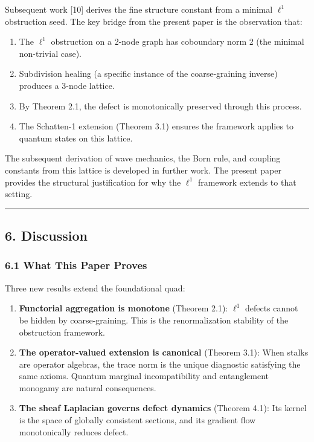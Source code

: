 \documentclass[
]{article}
\providecommand{\tightlist}{%
  \setlength{\itemsep}{0pt}\setlength{\parskip}{0pt}}
\begin{document}
Subsequent work {[}10{]} derives the fine structure constant from a
minimal \(\ell^1\) obstruction seed. The key bridge from the present
paper is the observation that:

\begin{enumerate}
\def\labelenumi{\arabic{enumi}.}
\tightlist
\item
  The \(\ell^1\) obstruction on a 2-node graph has coboundary norm 2
  (the minimal non-trivial case).
\item
  Subdivision healing (a specific instance of the coarse-graining
  inverse) produces a 3-node lattice.
\item
  By Theorem 2.1, the defect is monotonically preserved through this
  process.
\item
  The Schatten-1 extension (Theorem 3.1) ensures the framework applies
  to quantum states on this lattice.
\end{enumerate}

The subsequent derivation of wave mechanics, the Born rule, and coupling
constants from this lattice is developed in further work. The present
paper provides the structural justification for why the \(\ell^1\)
framework extends to that setting.

\begin{center}\rule{0.5\linewidth}{0.5pt}\end{center}

\subsection{6. Discussion}\label{discussion}

\subsubsection{6.1 What This Paper Proves}\label{what-this-paper-proves}

Three new results extend the foundational quad:

\begin{enumerate}
\def\labelenumi{\arabic{enumi}.}
\item
  \textbf{Functorial aggregation is monotone} (Theorem 2.1): \(\ell^1\)
  defects cannot be hidden by coarse-graining. This is the
  renormalization stability of the obstruction framework.
\item
  \textbf{The operator-valued extension is canonical} (Theorem 3.1):
  When stalks are operator algebras, the trace norm is the unique
  diagnostic satisfying the same axioms. Quantum marginal
  incompatibility and entanglement monogamy are natural consequences.
\item
  \textbf{The sheaf Laplacian governs defect dynamics} (Theorem 4.1):
  Its kernel is the space of globally consistent sections, and its
  gradient flow monotonically reduces defect.
\end{enumerate}
\end{document}
